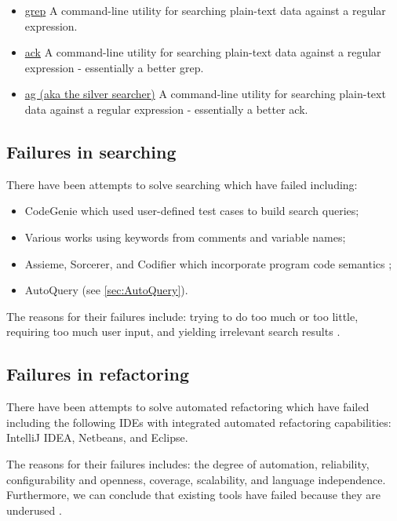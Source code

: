 \documentclass[12pt, letterpaper]{article}
\begin{document}
\begin{itemize}
  \item \href{https://en.wikipedia.org/wiki/Grep}{grep}\newline
  A command-line utility for searching plain-text data against a regular expression.
  \item \href{https://beyondgrep.com/}{ack}\newline
  A command-line utility for searching plain-text data against a regular expression - essentially a better grep.
  \item \href{https://github.com/ggreer/the_silver_searcher}{ag (aka the silver searcher)}\newline
  A command-line utility for searching plain-text data against a regular expression - essentially a better ack.
\end{itemize}

\subsection{Failures in searching}
There have been attempts to solve searching which have failed including:
\begin{itemize}
  \item CodeGenie which used user-defined test cases to build search queries;
  \item Various works using keywords from comments and variable names;
  \item Assieme, Sorcerer, and Codifier which incorporate program code semantics \autocite{reiss2009semantics};
  \item AutoQuery (see \ref{sec:AutoQuery}).
\end{itemize}

The reasons for their failures include: trying to do too much or too little, requiring too much user input, and yielding irrelevant search results \autocite{reiss2009semantics,stolee2014solving}.

\subsection{Failures in refactoring}
There have been attempts to solve automated refactoring which have failed including the following IDEs with integrated automated refactoring capabilities: IntelliJ IDEA, Netbeans, and Eclipse.

The reasons for their failures includes: the degree of automation, reliability, configurability and openness, coverage, scalability, and language independence. \autocite{mens2004survey} Furthermore, we can conclude that existing tools have failed because they are underused \autocite{murphy2012we}.
\end{document}
